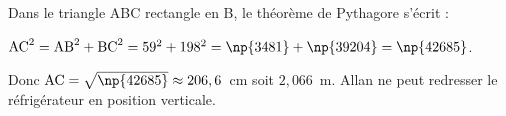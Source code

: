
\medskip

%
%
%
Dans le triangle ABC rectangle en B, le théorème de Pythagore s'écrit :

$\text{AC}^2 = \text{AB}^2 + \text{BC}^2 = 59^2 + 198^2 = \np{3481} + \np{39204} = \np{42685}$.

Donc $\text{AC} = \sqrt{\np{42685}} \approx 206,6$~cm soit $2,066$~m. Allan ne peut redresser le réfrigérateur en position verticale.

\vspace{0,5cm}

